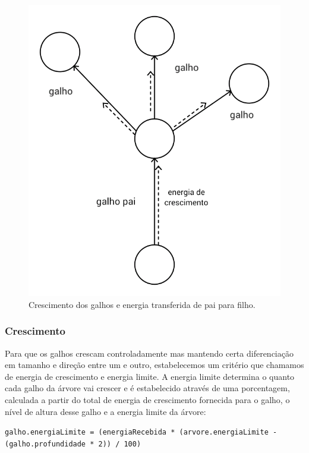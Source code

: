 \documentclass[12pt]{article}
\begin{document}
	\begin{figure}[ht!]
	\begin{center}
		\includegraphics[scale=0.2]{img/PI3_Ponto_Crescimento.png}
		\caption{\footnotesize {Crescimento dos galhos e energia transferida de pai para filho.} }
	\end{center}
	\end{figure}	
	
\subsubsection{Crescimento}
Para que os galhos crescam controladamente mas mantendo certa diferencia\c c\~ao em tamanho e
dire\c c\~ao entre um e outro, estabelecemos um crit\'erio que chamamos de energia de crescimento e energia limite.
A energia limite determina o quanto cada  galho da \'arvore vai crescer e \'e estabelecido atrav\'es de uma porcentagem,
calculada a partir do total de energia de crescimento fornecida para o galho, o n\'ivel de altura desse galho e a energia
limite da \'arvore:

  \texttt{\footnotesize{galho.energiaLimite = (energiaRecebida * (arvore.energiaLimite - (galho.profundidade * 2)) / 100)}}
\end{document}
